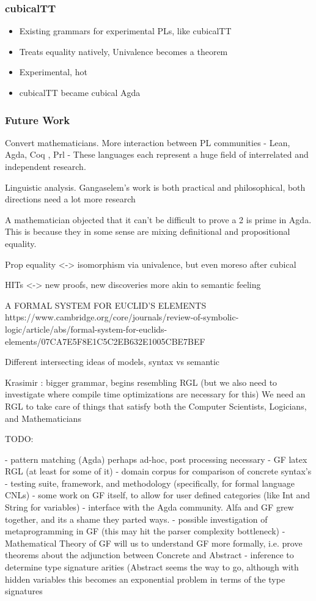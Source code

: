 \documentclass[10pt]{beamer}
\begin{document}
\begin{frame}
\frametitle{cubicalTT}

\begin{itemize}
\item Existing grammars for experimental PLs, like cubicalTT
\item Treats equality natively, Univalence becomes a theorem
\item Experimental, hot
\item cubicalTT became cubical Agda
\end{itemize}

\end{frame}

\begin{frame}
\frametitle{Future Work}

Convert mathematicians.
More interaction between PL communities - Lean, Agda, Coq , {Prl} -
These languages each represent a  huge field of interrelated and independent research.

Linguistic analysis.  Gangaselem's work is both practical and philosophical,
both directions need a lot more research

A mathematician objected that it can't be difficult to prove a 2 is prime in
Agda. This is because they in some sense are mixing definitional and
propositional equality.

Prop equality <-> isomorphism via univalence, but even moreso after cubical

HITs <-> new proofs, new discoveries more akin to semantic feeling

A FORMAL SYSTEM FOR EUCLID’S ELEMENTS
https://www.cambridge.org/core/journals/review-of-symbolic-logic/article/abs/formal-system-for-euclids-elements/07CA7E5F8E1C5C2EB632E1005CBE7BEF

Different intersecting ideas of models, syntax vs semantic

Krasimir : bigger grammar, begins resembling RGL
(but we also need to
investigate where compile time optimizations are necessary for this)
We need an RGL to take care of things that satisfy both the Computer Scientists,
Logicians, and Mathematicians

TODO:


- pattern matching (Agda) perhaps ad-hoc, post processing necessary
- GF latex RGL (at least for some of it)
- domain corpus for comparison of concrete syntax's
- testing suite, framework, and methodology (specifically, for formal language CNLs)
- some work on GF itself, to allow for user defined categories (like Int and
String for variables)
- interface with the Agda community.  Alfa and GF grew together, and its a shame
they parted ways.
- possible investigation of metaprogramming in GF (this may hit the parser
complexity bottleneck)
- Mathematical Theory of GF will us to understand GF more formally, i.e. prove
theorems about the adjunction between Concrete and Abstract
- inference to determine type signature arities (Abstract seems the way to go,
although with hidden variables this becomes an exponential problem in terms of
the type signatures


\end{frame}
\end{document}
